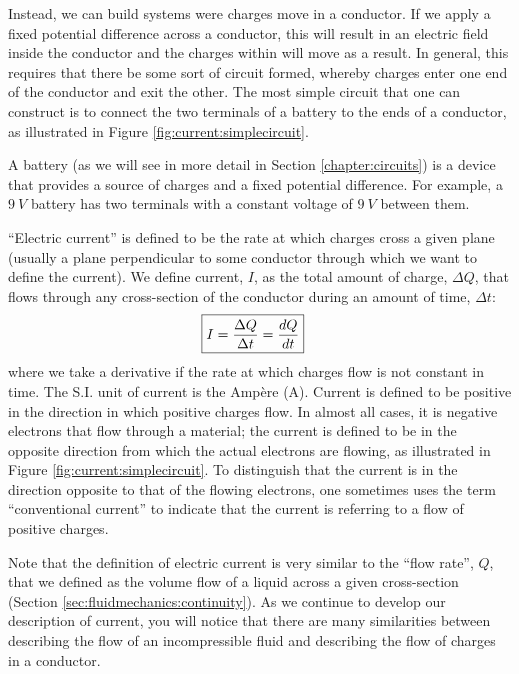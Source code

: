 Instead, we can build systems were charges move in a conductor. If we apply a fixed potential difference across a conductor, this will result in an electric field inside the conductor and the charges within will move as a result. In general, this requires that there be some sort of circuit formed, whereby charges enter one end of the conductor and exit the other. The most simple circuit that one can construct is to  connect the two terminals of a battery to the ends of a conductor, as illustrated in Figure \ref{fig:current:simplecircuit}. 


A battery (as we will see in more detail in Section \ref{chapter:circuits}) is a device that provides a source of charges and a fixed potential difference. For example, a $\SI{9}{V}$ battery has two terminals with a constant voltage of $\SI{9}{V}$ between them.


``Electric current'' is defined to be the rate at which charges cross a given plane (usually a plane perpendicular to some conductor through which we want to define the current). We define current, $I$, as the total amount of charge, $\Delta Q$, that flows through any cross-section of the conductor during an amount of time, $\Delta t$:
\begin{align*}
\Aboxed{I=\frac{\Delta Q}{\Delta t}=\frac{dQ}{dt}}
\end{align*}
where we take a derivative if the rate at which charges flow is not constant in time. The S.I. unit of current is the Amp\`ere (\si{A}). Current is defined to be positive in the direction in which positive charges flow. In almost all cases, it is negative electrons that flow through a material; the current is defined to be in the opposite direction from which the actual electrons are flowing, as illustrated in Figure \ref{fig:current:simplecircuit}. To distinguish that the current is in the direction opposite to that of the flowing electrons, one sometimes uses the term ``conventional current'' to indicate that the current is referring to a flow of positive charges.

Note that the definition of electric current is very similar to the ``flow rate'', $Q$, that we defined as the volume flow of a liquid across a given cross-section (Section \ref{sec:fluidmechanics:continuity}). As we continue to develop our description of current, you will notice that there are many similarities between describing the flow of an incompressible fluid and describing the flow of charges in a conductor.

